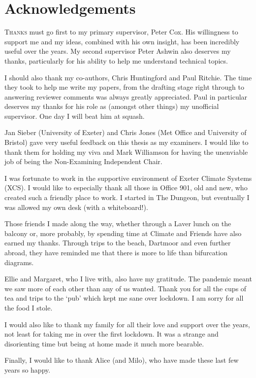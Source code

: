\chapter{Acknowledgements}

\lettrine[lines=3,loversize=0.1,findent=0.1em,nindent=0em]{T}{hanks} must go first to my primary supervisor, Peter Cox. His willingness to support me and my ideas, combined with his own insight,
has been incredibly useful over the years. My second supervisor Peter Ashwin also deserves my thanks,
particularly for his ability to help me understand technical topics.

I should also thank my co-authors, Chris Huntingford and Paul Ritchie. The time they took to help me
write my papers, from the drafting stage right through to answering reviewer comments was always greatly appreciated. Paul
in particular deserves my thanks for his role as (amongst other things) my unofficial supervisor. One day I will beat him at squash.

Jan Sieber (University of Exeter) and Chris Jones (Met Office and University of Bristol) gave very useful feedback on this thesis as my examiners.
I would like to thank them for holding my viva and Mark Williamson for having the unenviable job of being the Non-Examining Independent Chair.  

I was fortunate to work in the supportive environment of Exeter Climate Systems (XCS). I would like to especially thank 
all those in Office 901, old and new, who created such a friendly place to work. I started in The Dungeon,
but eventually I was allowed my own desk (with a whiteboard!).

Those friends I made along the way, whether through a Laver lunch on the balcony or, more probably, by spending time at Climate and
Friends have also earned my thanks. Through trips to the beach, Dartmoor and even further abroad, they have reminded me that there is more to life
than bifurcation diagrams.

Ellie and Margaret, who I live with, also have my gratitude. The pandemic meant we saw more of each other than any of us wanted.
Thank you for all the cups of tea and trips to the `pub' which kept me sane over lockdown. I am sorry for
all the food I stole.

I would also like to thank my family for all their love and support over the years, not least for taking me in over the first lockdown.
It was a strange and disorienting time but being at home made it much more bearable.

Finally, I would like to thank Alice (and Milo), who have made these last few years so happy.